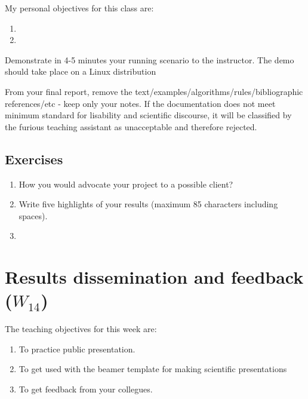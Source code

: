 \documentclass[a4paper,12pt]{report}
\begin{document}
\vspace{0.5cm}

My personal objectives for this class are:
\begin{enumerate}
 \item 
 \item 
\end{enumerate}


Demonstrate in 4-5 minutes your running scenario to the instructor. 
The demo should take place on a Linux distribution


From your final report, remove the text/examples/algorithms/rules/bibliographic references/etc - keep only your notes. 
If the documentation does not meet minimum standard for lisability and scientific discourse, 
it will be classified by the furious teaching assistant as unacceptable and therefore rejected.




\section{Exercises}
\begin{enumerate}
 \item How you would advocate your project to a possible client?
 \item Write five highlights of your results (maximum 85 characters including spaces).
 \item 
\end{enumerate}

\vspace{0.5cm}

\vspace{0.5cm}


\chapter{Results dissemination and feedback ($W_{14}$)}

The teaching objectives for this week are:
\begin{enumerate}
\item To practice public presentation.
\item To get used with the beamer template for making scientific presentations
 \item To get feedback from your collegues. 
\end{enumerate}
\end{document}
